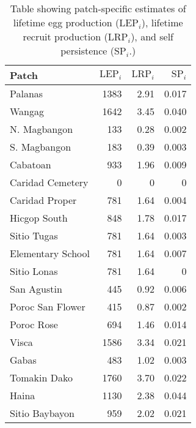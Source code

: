 \documentclass[12pt, oneside]{article}   	%
\begin{document}
\begin{table}[!htbp]
\caption{Table showing patch-specific estimates of lifetime egg production ($\text{LEP}_i$), lifetime recruit production ($\text{LRP}_i$), and self persistence ($\text{SP}_i$.)} \label{APP_TAB_PatchSpecificLEPandLRP}
\begin{centering}
\begin{tabular}{|l|r|r|r|}
\hline 
Patch & $\text{LEP}_i$ & $\text{LRP}_i$ & $\text{SP}_i$ \\ \hline
Palanas & 1383 & 2.91 & 0.017 \\ \hline  
Wangag & 1642 & 3.45 & 0.040 \\ \hline  
N. Magbangon & 133 & 0.28 & 0.002 \\ \hline
S. Magbangon & 183 & 0.39 & 0.003 \\ \hline
Cabatoan & 933 & 1.96 & 0.009 \\ \hline
Caridad Cemetery & 0 & 0 & 0 \\ \hline
Caridad Proper & 781 & 1.64 & 0.004 \\ \hline 
Hicgop South & 848 & 1.78 & 0.017 \\ \hline
Sitio Tugas & 781 & 1.64 & 0.003 \\ \hline  
Elementary School & 781 & 1.64 & 0.007 \\ \hline  
Sitio Lonas & 781 & 1.64 & 0 \\ \hline  
San Agustin & 445 & 0.92 & 0.006 \\ \hline  
Poroc San Flower & 415 & 0.87 & 0.002 \\ \hline
Poroc Rose & 694 & 1.46 & 0.014 \\ \hline
Visca & 1586 & 3.34 & 0.021 \\ \hline
Gabas & 483 & 1.02 & 0.003 \\ \hline
Tomakin Dako & 1760 & 3.70 & 0.022 \\ \hline  
Haina & 1130 & 2.38 & 0.044 \\ \hline
Sitio Baybayon & 959 & 2.02 & 0.021\\ \hline  
\end{tabular}
\end{centering}
\end{table}

\end{document}
